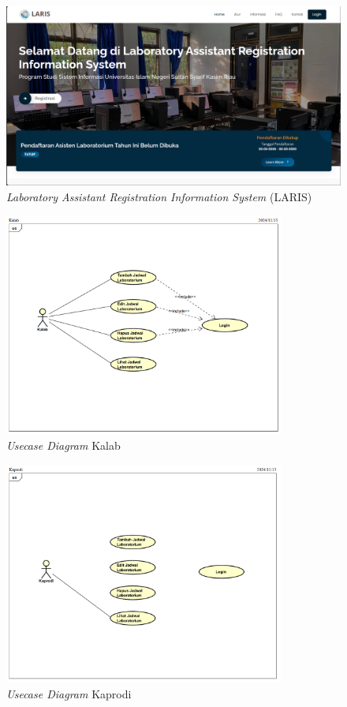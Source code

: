 \begin{figure}
	\centering
	\includegraphics[width=0.82\linewidth]{konten//gambar/laris.png}
	\caption{\textit{Laboratory Assistant Registration Information System} (LARIS)}
	\label{fig:laris-bab2}
\end{figure}


\begin{figure}
	\centering
	\includegraphics[width=0.82\textwidth]{konten/gambar/usecase-diagram/kalab.png}
	\caption{\textit{Usecase Diagram} Kalab}
	\label{usecase-diagram-kalab}
\end{figure}

\begin{figure}
	\centering
	\includegraphics[width=0.82\textwidth]{konten/gambar/usecase-diagram/kaprodi.png}
	\caption{\textit{Usecase Diagram} Kaprodi}
	\label{usecase-diagram-kaprodi}
\end{figure}


